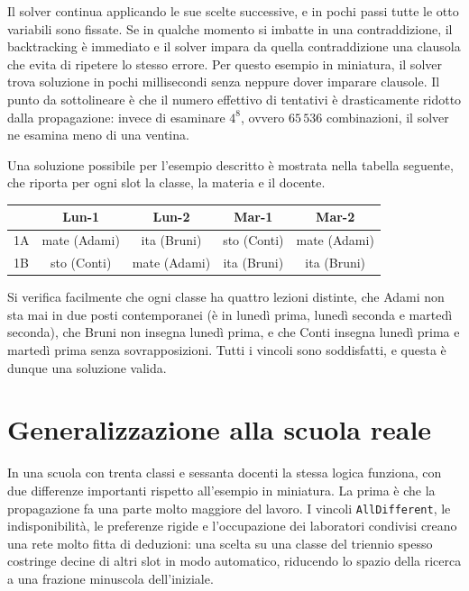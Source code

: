 Il solver continua applicando le sue scelte successive, e
in pochi passi tutte le otto variabili sono fissate. Se in
qualche momento si imbatte in una contraddizione, il
backtracking \`e immediato e il solver impara da quella
contraddizione una clausola che evita di ripetere lo stesso
errore. Per questo esempio in miniatura, il solver trova
soluzione in pochi millisecondi senza neppure dover imparare
clausole. Il punto da sottolineare \`e che il numero
effettivo di tentativi \`e drasticamente ridotto dalla
propagazione: invece di esaminare $4^8$, ovvero $65\,536$
combinazioni, il solver ne esamina meno di una ventina.

\begin{esempiobox}
Una soluzione possibile per l'esempio descritto \`e
mostrata nella tabella seguente, che riporta per ogni slot
la classe, la materia e il docente.

\begin{center}
\sffamily\small
\begin{tabular}{lcccc}
\toprule
& Lun-1 & Lun-2 & Mar-1 & Mar-2 \\
\midrule
1A & mate (Adami)  & ita (Bruni) & sto (Conti) & mate (Adami) \\
1B & sto (Conti)   & mate (Adami) & ita (Bruni) & ita (Bruni) \\
\bottomrule
\end{tabular}
\end{center}

Si verifica facilmente che ogni classe ha quattro lezioni
distinte, che Adami non sta mai in due posti contemporanei
(\`e in luned\`i prima, luned\`i seconda e marted\`i seconda),
che Bruni non insegna luned\`i prima, e che Conti insegna
luned\`i prima e marted\`i prima senza sovrapposizioni.
Tutti i vincoli sono soddisfatti, e questa \`e dunque una
soluzione valida.
\end{esempiobox}

\section{Generalizzazione alla scuola reale}

In una scuola con trenta classi e sessanta docenti la
stessa logica funziona, con due differenze importanti
rispetto all'esempio in miniatura. La prima \`e che la
propagazione fa una parte molto maggiore del lavoro. I
vincoli \texttt{AllDifferent}, le indisponibilit\`a, le
preferenze rigide e l'occupazione dei laboratori condivisi
creano una rete molto fitta di deduzioni: una scelta su una
classe del triennio spesso costringe decine di altri slot in
modo automatico, riducendo lo spazio della ricerca a una
frazione minuscola dell'iniziale.

